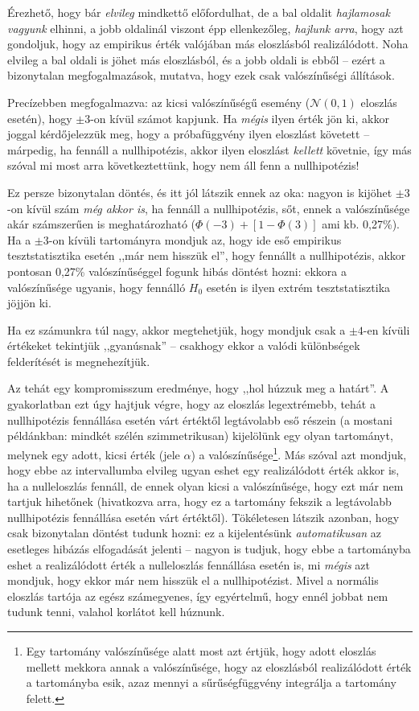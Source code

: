 \documentclass[]{book}
\let\rmarkdownfootnote\footnote%
\def\footnote{\protect\rmarkdownfootnote}
\begin{document}
Érezhető, hogy bár \emph{elvileg} mindkettő előfordulhat, de a bal
oldalit \emph{hajlamosak vagyunk} elhinni, a jobb oldalinál viszont épp
ellenkezőleg, \emph{hajlunk arra}, hogy azt gondoljuk, hogy az empirikus
érték valójában más eloszlásból realizálódott. Noha elvileg a bal oldali
is jöhet más eloszlásból, és a jobb oldali is ebből -- ezért a
bizonytalan megfogalmazások, mutatva, hogy ezek csak valószínűségi
állítások.

Precízebben megfogalmazva: az kicsi valószínűségű esemény
(\(\mathcal{N}\left(0,1\right)\) eloszlás esetén), hogy \(\pm 3\)-on
kívül számot kapjunk. Ha \emph{mégis} ilyen érték jön ki, akkor joggal
kérdőjelezzük meg, hogy a próbafüggvény ilyen eloszlást követett --
márpedig, ha fennáll a nullhipotézis, akkor ilyen eloszlást
\emph{kellett} követnie, így más szóval mi most arra következtettünk,
hogy nem áll fenn a nullhipotézis!

Ez persze bizonytalan döntés, és itt jól látszik ennek az oka: nagyon is
kijöhet \(\pm 3\)-on kívül szám \emph{még akkor is}, ha fennáll a
nullhipotézis, sőt, ennek a valószínűsége akár számszerűen is
meghatározható
(\(\Phi\left(-3\right)+\left[1-\Phi\left(3\right)\right]\) ami kb.
0,27\%). Ha a \(\pm 3\)-on kívüli tartományra mondjuk az, hogy ide eső
empirikus tesztstatisztika esetén ,,már nem hisszük el'', hogy fennállt
a nullhipotézis, akkor pontosan 0,27\% valószínűséggel fogunk hibás
döntést hozni: ekkora a valószínűsége ugyanis, hogy fennálló \(H_0\)
esetén is ilyen extrém tesztstatisztika jöjjön ki.

Ha ez számunkra túl nagy, akkor megtehetjük, hogy mondjuk csak a
\(\pm 4\)-en kívüli értékeket tekintjük ,,gyanúsnak'' -- csakhogy ekkor
a valódi különbségek felderítését is megnehezítjük.

Az tehát egy kompromisszum eredménye, hogy ,,hol húzzuk meg a határt''.
A gyakorlatban ezt úgy hajtjuk végre, hogy az eloszlás legextrémebb,
tehát a nullhipotézis fennállása esetén várt értéktől legtávolabb eső
részein (a mostani példánkban: mindkét szélén szimmetrikusan) kijelölünk
egy olyan tartományt, melynek egy adott, kicsi érték (jele \(\alpha\)) a
valószínűsége\footnote{Egy tartomány valószínűsége alatt most azt értjük, hogy adott eloszlás mellett mekkora annak a valószínűsége, hogy az eloszlásból realizálódott érték a tartományba esik, azaz mennyi a sűrűségfüggvény integrálja a tartomány felett.}.
Más szóval azt mondjuk, hogy ebbe az intervallumba elvileg ugyan eshet
egy realizálódott érték akkor is, ha a nulleloszlás fennáll, de ennek
olyan kicsi a valószínűsége, hogy ezt már nem tartjuk hihetőnek
(hivatkozva arra, hogy ez a tartomány fekszik a legtávolabb
nullhipotézis fennállása esetén várt értéktől). Tökéletesen látszik
azonban, hogy csak bizonytalan döntést tudunk hozni: ez a kijelentésünk
\emph{automatikusan} az esetleges hibázás elfogadását jelenti -- nagyon
is tudjuk, hogy ebbe a tartományba eshet a realizálódott érték a
nulleloszlás fennállása esetén is, mi \emph{mégis} azt mondjuk, hogy
ekkor már nem hisszük el a nullhipotézist. Mivel a normális eloszlás
tartója az egész számegyenes, így egyértelmű, hogy ennél jobbat nem
tudunk tenni, valahol korlátot kell húznunk.
\end{document}
